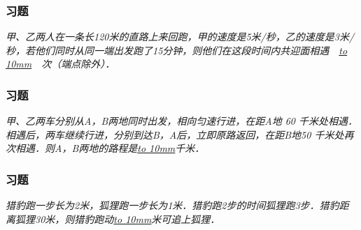 \begin{frame}
    \frametitle{习题\theframecounter}
    \textit{甲、乙两人在一条长120米的直路上来回跑，甲的速度是5米/秒，乙的速度是3米/秒，若他们同时从同一端出发跑了15分钟，则他们在这段时间内共迎面相遇　\underline{\hbox to 10mm{}}　次（端点除外）．}
\end{frame}

\begin{frame}
    \frametitle{习题\theframecounter}
    \textit{甲、乙两车分别从A，B两地同时出发，相向匀速行进，在距A地 60 千米处相遇．相遇后，两车继续行进，分别到达B，A后，立即原路返回，在距B地50 千米处再次相遇．则A，B两地的路程是\underline{\hbox to 10mm{}}千米．}
\end{frame}

\begin{frame}
    \frametitle{习题\theframecounter}
    \textit{猎豹跑一步长为2米，狐狸跑一步长为1米．猎豹跑2步的时间狐狸跑3步．猎豹距离狐狸30米，则猎豹跑动\underline{\hbox to 10mm{}}米可追上狐狸．}
\end{frame}
